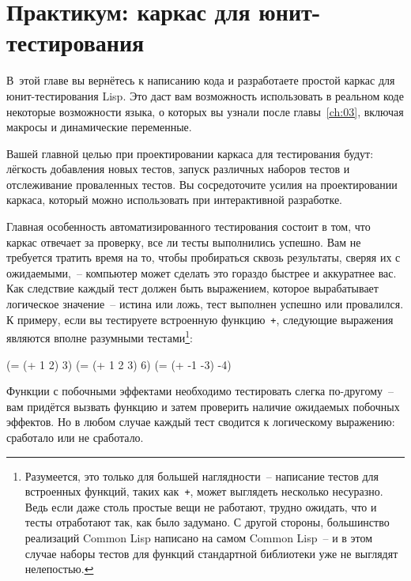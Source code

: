 \chapter{Практикум: каркас для юнит-тестирования}
\label{ch:09}

\thispagestyle{empty}

В~этой главе вы вернётесь к написанию кода и разработаете простой каркас для
юнит-тестирования Lisp. Это даст вам возможность использовать в реальном коде некоторые
возможности языка, о которых вы узнали после главы~\ref{ch:03}, включая макросы и динамические
переменные.

Вашей главной целью при проектировании каркаса для тестирования будут: лёгкость добавления
новых тестов, запуск различных наборов тестов и отслеживание проваленных тестов. Вы
сосредоточите усилия на проектировании каркаса, который можно использовать при
интерактивной разработке.

Главная особенность автоматизированного тестирования состоит в том, что каркас отвечает за
проверку, все ли тесты выполнились успешно. Вам не требуется тратить время на то, чтобы
пробираться сквозь результаты, сверяя их с ожидаемыми,~-- ком\-пью\-тер может сделать это
гораздо быстрее и аккуратнее вас. Как следствие каждый тест должен быть выражением,
которое вырабатывает логическое значение~-- истина или ложь, тест выполнен успешно или
провалился. К примеру, если вы тестируете встроенную функцию~\lstinline{+}, следующие
выражения являются вполне разумными тестами\footnote{Разумеется, это только для большей
  наглядности~-- написание тестов для встроенных функций, таких как~\lstinline{+}, может
  выглядеть несколько несуразно. Ведь если даже столь простые вещи не работают, трудно
  ожидать, что и тесты отработают так, как было задумано. С другой стороны, большинство
  реализаций Common Lisp написано на самом Common Lisp~-- и в этом случае наборы тестов
  для функций стандартной библиотеки уже не выглядят нелепостью.}\hspace{\footnotenegspace}:

\begin{myverb}
(= (+ 1 2) 3)
(= (+ 1 2 3) 6)
(= (+ -1 -3) -4)
\end{myverb}

Функции с побочными эффектами необходимо тестировать слегка по-другому~-- вам придётся
вызвать функцию и затем проверить наличие ожидаемых побочных эффектов. Но в любом случае каждый тест сводится
к логическому выражению: сработало или не сработало.

